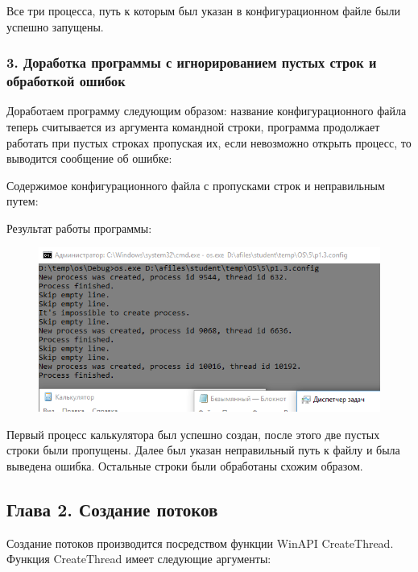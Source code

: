 \documentclass[14pt,a4paper,report]{report}
\begin{document}
Все три процесса, путь к которым был указан в конфигурационном файле были успешно запущены.

\subsubsection{3. Доработка программы с игнорированием пустых строк и обработкой ошибок}

Доработаем программу следующим образом: название конфигурационного файла теперь считывается из аргумента командной строки, программа продолжает работать при пустых строках пропуская их, если невозможно открыть процесс, то выводится сообщение об ошибке:



Содержимое конфигурационного файла с пропусками строк и неправильным путем:



Результат работы программы:

\begin{figure}[h!]
	\centering
	\includegraphics[scale = 0.85]{images/p1_3.png}
	
	\caption{}
	\label{image:4}
\end{figure}

Первый процесс калькулятора был успешно создан, после этого две пустых строки были пропущены. Далее был указан неправильный путь к файлу и была выведена ошибка. Остальные строки были обработаны схожим образом. 

\subsection{Глава 2. Создание потоков}

Создание потоков производится посредством функции WinAPI CreateThread. Функция CreateThread имеет следующие аргументы:
\end{document}
